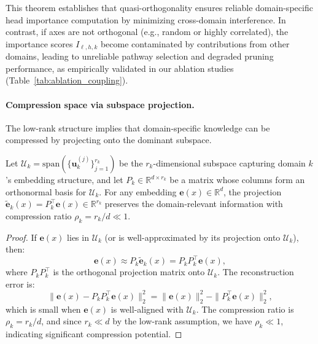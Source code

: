 This theorem establishes that quasi-orthogonality ensures reliable domain-specific head importance computation by minimizing cross-domain interference.
In contrast, if axes are not orthogonal (e.g., random or highly correlated), the importance scores $I_{\ell,h,k}$ become contaminated by contributions from other domains, leading to unreliable pathway selection and degraded pruning performance, as empirically validated in our ablation studies (Table~\ref{tab:ablation_coupling}).

\paragraph{Compression space via subspace projection.}
The low-rank structure implies that domain-specific knowledge can be compressed by projecting onto the dominant subspace.

\begin{proposition}
\label{prop:compression}
Let $\mathcal{U}_k = \mathrm{span}(\{\mathbf{u}_k^{(j)}\}_{j=1}^{r_k})$ be the $r_k$-dimensional subspace capturing domain $k$'s embedding structure, and let $P_k \in \mathbb{R}^{d \times r_k}$ be a matrix whose columns form an orthonormal basis for $\mathcal{U}_k$.
For any embedding $\mathbf{e}(x) \in \mathbb{R}^d$, the projection $\tilde{\mathbf{e}}_k(x) = P_k^\top \mathbf{e}(x) \in \mathbb{R}^{r_k}$ preserves the domain-relevant information with compression ratio $\rho_k = r_k/d \ll 1$.
\end{proposition}

\begin{proof}
If $\mathbf{e}(x)$ lies in $\mathcal{U}_k$ (or is well-approximated by its projection onto $\mathcal{U}_k$), then:
\begin{equation}
\mathbf{e}(x) \approx P_k \tilde{\mathbf{e}}_k(x) = P_k P_k^\top \mathbf{e}(x),
\end{equation}
where $P_k P_k^\top$ is the orthogonal projection matrix onto $\mathcal{U}_k$.
The reconstruction error is:
\begin{equation}
\|\mathbf{e}(x) - P_k P_k^\top \mathbf{e}(x)\|_2^2 = \|\mathbf{e}(x)\|_2^2 - \|P_k^\top \mathbf{e}(x)\|_2^2,
\end{equation}
which is small when $\mathbf{e}(x)$ is well-aligned with $\mathcal{U}_k$.
The compression ratio is $\rho_k = r_k/d$, and since $r_k \ll d$ by the low-rank assumption, we have $\rho_k \ll 1$, indicating significant compression potential.
\end{proof}


